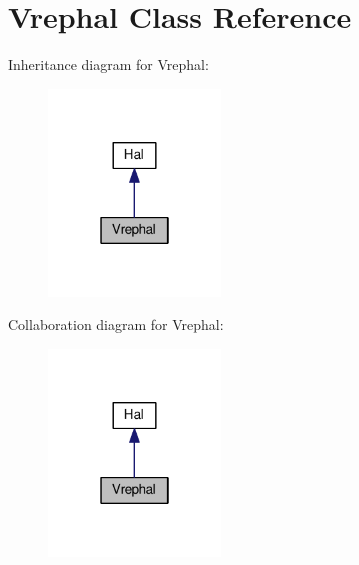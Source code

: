 \hypertarget{class_vrephal}{}\section{Vrephal Class Reference}
\label{class_vrephal}


Inheritance diagram for Vrephal\+:
\nopagebreak
\begin{figure}[H]
\begin{center}
\leavevmode
\includegraphics[width=130pt]{class_vrephal__inherit__graph}
\end{center}
\end{figure}


Collaboration diagram for Vrephal\+:
\nopagebreak
\begin{figure}[H]
\begin{center}
\leavevmode
\includegraphics[width=130pt]{class_vrephal__coll__graph}
\end{center}
\end{figure}
